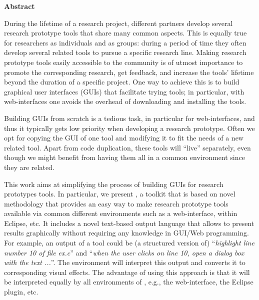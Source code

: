{%
}

\newpage

\thispagestyle{empty}

\begin{center}
{\bf \Huge Abstract}
\end{center}

\vspace{1cm}
During the lifetime of a research project, different partners develop
several research prototype tools that share many common aspects.
%
This is equally true for researchers as individuals and as groups:
during a period of time they often develop several related tools to
pursue a specific research line.
%
Making research prototype tools easily accessible to the community is
of utmost importance to promote the corresponding research, get
feedback, and increase the tools' lifetime beyond the duration of a
specific project.
%
One way to achieve this is to build graphical user interfaces (GUIs)
that facilitate trying tools; in particular, with web-interfaces one
avoids the overhead of downloading and installing the tools.

Building GUIs from scratch is a tedious task, in particular for
web-interfaces, and thus it typically gets low priority when
developing a research prototype. Often we opt for copying the GUI of
one tool and modifying it to fit the needs of a new related tool.
%
Apart from code duplication, these tools will ``live'' separately,
even though we might benefit from having them all in a common
environment since they are related.

This work aims at simplifying the process of building GUIs for
research prototypes tools. In particular, we present \ei, a toolkit
that is based on novel methodology that provides an easy way to make
research prototype tools available via common different environments
such as a web-interface, within Eclipse, etc.
%
It includes a novel text-based output language that allows to present
results graphically without requiring any knowledge in GUI/Web
programming. For example, an output of a tool could be (a structured
version of) ``\emph{highlight line number 10 of file ex.c}'' and
``\emph{when the user clicks on line 10, open a dialog box with the
  text ...}''. The environment will interpret this output and converts
it to corresponding visual effects. The advantage of using this
approach is that it will be interpreted equally by all environments of
\ei, e.g., the web-interface, the Eclipse plugin, etc.
%


